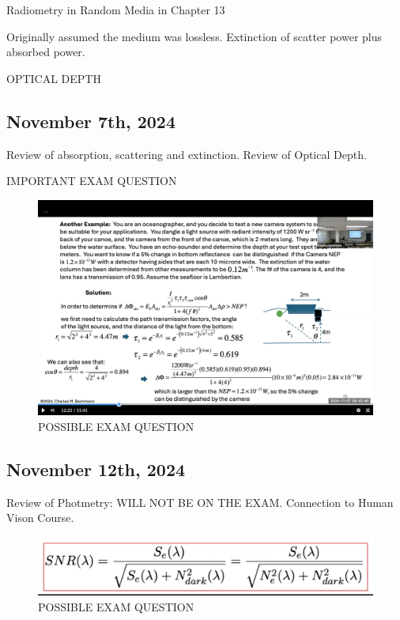 \documentclass{article}
\begin{document}
Radiometry in Random Media in Chapter 13

Originally assumed the medium was lossless. 
Extinction of scatter power plus absorbed power. 


OPTICAL DEPTH 

\subsection{November 7th, 2024}
Review of absorption, scattering and extinction. 
Review of Optical Depth. 

IMPORTANT EXAM QUESTION

\begin{figure}[h!]
\centering
\includegraphics[scale=.35]{Radiometry/Screenshot_Optical_Depth_Ocean_Floor.png}
\caption{POSSIBLE EXAM QUESTION}
\label{fig:POSSIBLE EXAM QUESTION}
\end{figure}

\subsection{November 12th, 2024}
Review of Photmetry: WILL NOT BE ON THE EXAM. Connection to Human Vison Course. 
\begin{figure}[h!]
\centering
\includegraphics[scale=.35]{Radiometry/Shot_Noise_Exam.png}
\caption{POSSIBLE EXAM QUESTION}
\label{fig:POSSIBLE EXAM QUESTION}
\end{figure}
\end{document}
